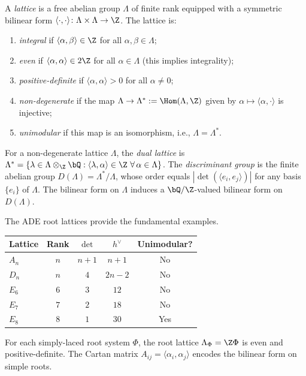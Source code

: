 \begin{definition}[Lattice]\label{def:lattice:lattice}
A \emph{lattice} is a free abelian group $\Lambda$ of finite rank
equipped with a symmetric bilinear form
$\langle \cdot, \cdot \rangle \colon \Lambda \times \Lambda \to \Z$.
The lattice is:
\begin{enumerate}[label=(\roman*)]
\item \emph{integral} if $\langle \alpha, \beta \rangle \in \Z$ for all
 $\alpha, \beta \in \Lambda$;
\item \emph{even} if $\langle \alpha, \alpha \rangle \in 2\Z$ for all
 $\alpha \in \Lambda$ (this implies integrality);
\item \emph{positive-definite} if $\langle \alpha, \alpha \rangle > 0$
 for all $\alpha \neq 0$;
\item \emph{non-degenerate} if the map
 $\Lambda \to \Lambda^* := \Hom(\Lambda, \Z)$ given by
 $\alpha \mapsto \langle \alpha, \cdot \rangle$ is injective;
\item \emph{unimodular} if this map is an isomorphism, i.e.,
 $\Lambda = \Lambda^*$.
\end{enumerate}
\end{definition}

\begin{definition}\label{def:lattice:discriminant}
For a non-degenerate lattice $\Lambda$, the \emph{dual lattice} is
$\Lambda^* = \{\lambda \in \Lambda \otimes_\Z \bQ :
\langle \lambda, \alpha \rangle \in \Z \ \forall\, \alpha \in \Lambda\}$.
The \emph{discriminant group} is the finite abelian group
$D(\Lambda) = \Lambda^*/\Lambda$,
whose order equals $|\det(\langle e_i, e_j \rangle)|$ for any basis
$\{e_i\}$ of $\Lambda$. The bilinear form on $\Lambda$ induces a
$\bQ/\Z$-valued bilinear form on $D(\Lambda)$.
\end{definition}

\begin{example}\label{ex:lattice:root-lattices}
The ADE root lattices provide the fundamental examples.
\begin{center}
\begin{tabular}{l c c c c}
\textbf{Lattice} & \textbf{Rank} & $\det$ & $h^\vee$ & \textbf{Unimodular?} \\
\hline
$A_n$ & $n$ & $n+1$ & $n+1$ & No \\
$D_n$ & $n$ & $4$ & $2n-2$ & No \\
$E_6$ & $6$ & $3$ & $12$ & No \\
$E_7$ & $7$ & $2$ & $18$ & No \\
$E_8$ & $8$ & $1$ & $30$ & Yes
\end{tabular}
\end{center}
For each simply-laced root system $\Phi$, the root lattice
$\Lambda_\Phi = \Z\Phi$ is even and positive-definite.
The Cartan matrix $A_{ij} = \langle \alpha_i, \alpha_j \rangle$ encodes
the bilinear form on simple roots.
\end{example}


